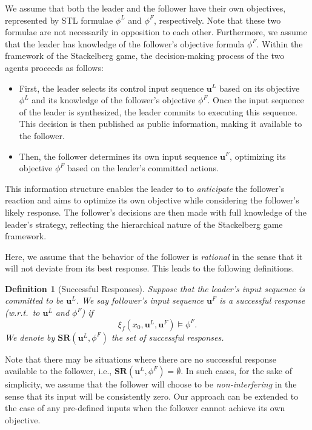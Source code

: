 \documentclass[letterpaper, 10 pt, conference]{ieeeconf}
\newtheorem{definition}{\bf Definition}
\begin{document}
We assume that both the leader and the follower have their own objectives, represented by STL formulae $\phi^L$ and $\phi^F$, respectively. Note that these two formulae are not necessarily in opposition to each other. Furthermore, we assume that the leader has knowledge of the follower's objective formula $\phi^F$. 
Within the framework of the Stackelberg game, the decision-making process of the two agents proceeds as follows: 
\begin{itemize}
  \item 
  First, the leader selects its control input sequence $\mathbf{u}^L$ based on its objective $\phi^L$ and its knowledge of the follower's objective $\phi^F$.  Once the input sequence of the leader is synthesized, the leader commits to executing this sequence. This decision is then published as public information, making it available to the follower.  
  \item  
  Then, the follower determines its own input sequence $\mathbf{u}^F$, optimizing its objective $\phi^F$ based on the leader's committed actions. 
\end{itemize}
This information structure enables the leader to to \emph{anticipate} the follower's reaction and aims to optimize its own objective while considering the follower's likely response. The follower's decisions are then made with full knowledge of the leader's strategy, reflecting the hierarchical nature of the Stackelberg game framework.

Here, we assume that the behavior of the follower is \emph{rational} in the sense that it will not deviate from its best response.  This leads to the following definitions.  
\begin{definition}[Successful Responses]
Suppose that the leader's input sequence is committed to be  $\mathbf{u}^L$. 
We say  follower's input sequence $\mathbf{u}^F$ is a \emph{successful response} (w.r.t.\ to $\mathbf{u}^L$ and $\phi^F$) if 
\[
\xi_f(x_0,\mathbf{u}^L,\mathbf{u}^F)\models\phi^F.
\]
We denote by $\mathbf{SR}(\mathbf{u}^L,{\phi^F})$ the set of successful responses.
\end{definition}

Note that there may be situations where there are no successful response available to the follower, i.e., $\mathbf{SR}(\mathbf{u}^L,\phi^F)=\emptyset$. 
In such cases, for the sake of simplicity, we assume that the follower will choose to be \emph{non-interfering} in the sense that  its input will be consistently zero.  
Our approach can be extended to the case of any pre-defined inputs when the follower cannot achieve its own objective. 
\end{document}
